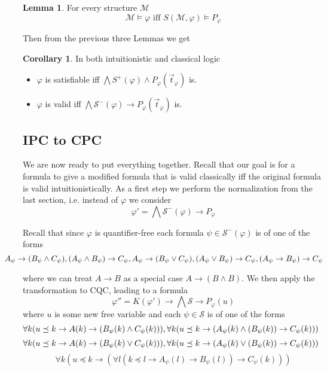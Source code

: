 \documentclass[a4paper,12pt]{report}
\theoremstyle{definition}
\theoremstyle{definition}
\newtheorem{corollary}[theorem]{Corollary}
\theoremstyle{definition}
\newtheorem{lemma}[theorem]{Lemma}
\theoremstyle{definition}
\theoremstyle{definition}
\theoremstyle{definition}
\theoremstyle{definition}
\begin{document}
	\begin{lemma}
		For every structure $\mathcal M$
		$$\mathcal M\models \varphi\text{ iff }S(\mathcal M, \varphi)\models P_\varphi$$
	\end{lemma}

	Then from the previous three Lemmas we get
	
	\begin{corollary}
		In both intuitionistic and classical logic
		\begin{itemize}
			\item $\varphi$ is satisfiable iff $\mathcal \bigwedge S^+(\varphi)\wedge P_\varphi(\vec t_\varphi)$ is. 
			\item $\varphi$ is valid iff $\bigwedge\mathcal S^-(\varphi)\to P_\varphi(\vec t_\varphi)$ is.
		\end{itemize}
	\end{corollary}
	
	\subsection{IPC to CPC}

	We are now ready to put everything together. Recall that our goal is for a formula to give a modified formula that is valid classically iff the original formula is valid intuitionistically. As a first step we perform the normalization from the last section, i.e. instead of $\varphi$ we consider $$\varphi' = \bigwedge \mathcal S^-(\varphi)\to P_\varphi$$
	
	Recall that since $\varphi$ is quantifier-free each formula $\psi\in\mathcal S^-(\varphi)$ is of one of the forms
	$$\hspace{-0.8cm}A_\psi\to (B_\psi\wedge C_\psi), (A_\psi\wedge B_\psi)\to C_\psi, A_\psi\to (B_\psi\vee C_\psi), (A_\psi\vee B_\psi)\to C_\psi, (A_\psi\to B_\psi)\to C_\psi$$
	
	where we can treat $A\to B$ as a special case $A\to (B\wedge B)$. We then apply the transformation to CQC, leading to a formula
	$$\varphi'' = K(\varphi')\to\bigwedge  \mathcal S\to P_\varphi(u)$$
	where $u$ is some new free variable and each $\psi\in\mathcal S$ is of one of the forms
	$$\hspace*{-2mm}\forall k(u\preceq k\to A(k)\to (B_\psi(k)\wedge C_\psi(k))), \forall k(u\preceq k\to (A_\psi(k)\wedge (B_\psi(k))\to C_\psi(k)))$$
	$$\hspace*{-2mm}\forall k(u\preceq k\to A(k)\to (B_\psi(k)\vee C_\psi(k))), \forall k(u\preceq k\to (A_\psi(k)\vee (B_\psi(k))\to C_\psi(k)))$$
	$$\forall k(u\preceq k\to (\forall l(k\preceq l \to A_\psi(l)\to B_\psi(l))\to C_\psi(k)))$$
	
\end{document}
